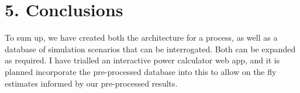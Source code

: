 \chapter*{5. Conclusions}
\setcounter{chapter}{5}
\setcounter{section}{0}

To sum up, we have created both the architecture for a process, as well as a database of simulation scenarios that can be interrogated.  Both can be expanded as required. I have trialled an interactive power calculator web app, and it is planned incorporate the pre-processed database into this to allow on the fly estimates informed by our pre-processed results.